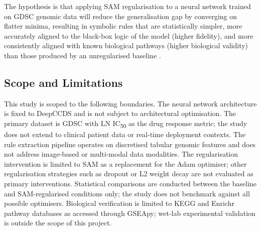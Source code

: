 \noindent
The hypothesis is that applying SAM regularisation to a neural network trained on GDSC genomic
data will reduce the generalisation gap by converging on flatter minima, resulting in symbolic rules
that are statistically simpler, more accurately aligned to the black-box logic of the model (higher
fidelity), and more consistently aligned with known biological pathways (higher biological validity)
than those produced by an unregularised baseline \cite{Foret2021, Li2018, Springer2024, Yedjour2024}.

\subsection*{Scope and Limitations}

This study is scoped to the following boundaries. The neural network architecture is fixed to
DeepCCDS \cite{Wu2025} and is not subject to architectural optimisation. The primary dataset is
GDSC with LN IC\textsubscript{50} as the drug response metric; the study does not extend to
clinical patient data or real-time deployment contexts. The rule extraction pipeline operates on
discretised tabular genomic features and does not address image-based or multi-modal data
modalities. The regularisation intervention is limited to SAM as a replacement for the Adam
optimiser; other regularisation strategies such as dropout or L2 weight decay are not evaluated as
primary interventions. Statistical comparisons are conducted between the baseline and
SAM-regularised conditions only; the study does not benchmark against all possible optimisers.
Biological verification is limited to KEGG and Enrichr pathway databases as accessed through
GSEApy; wet-lab experimental validation is outside the scope of this project.